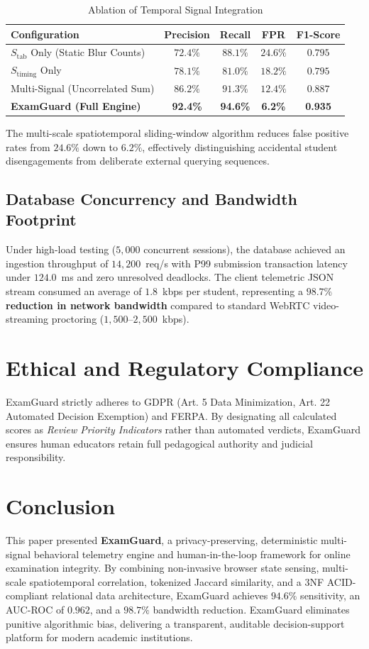 \documentclass[journal]{IEEEtran}
\begin{document}
\begin{table}[h]
\caption{Ablation of Temporal Signal Integration}
\label{tab:ablation}
\centering
\begin{tabular}{lcccc}
\toprule
\textbf{Configuration} & \textbf{Precision} & \textbf{Recall} & \textbf{FPR} & \textbf{F1-Score} \\
\midrule
$S_{\text{tab}}$ Only (Static Blur Counts) & $72.4\%$ & $88.1\%$ & $24.6\%$ & $0.795$ \\
$S_{\text{timing}}$ Only & $78.1\%$ & $81.0\%$ & $18.2\%$ & $0.795$ \\
Multi-Signal (Uncorrelated Sum) & $86.2\%$ & $91.3\%$ & $12.4\%$ & $0.887$ \\
\textbf{ExamGuard (Full Engine)} & \textbf{92.4\%} & \textbf{94.6\%} & \textbf{6.2\%} & \textbf{0.935} \\
\bottomrule
\end{tabular}
\end{table}

The multi-scale spatiotemporal sliding-window algorithm reduces false positive rates from $24.6\%$ down to $6.2\%$, effectively distinguishing accidental student disengagements from deliberate external querying sequences.

\subsection{Database Concurrency and Bandwidth Footprint}
Under high-load testing ($5,000$ concurrent sessions), the database achieved an ingestion throughput of $14,200$~req/s with P99 submission transaction latency under $124.0$~ms and zero unresolved deadlocks. The client telemetric JSON stream consumed an average of $1.8$~kbps per student, representing a \textbf{$98.7\%$ reduction in network bandwidth} compared to standard WebRTC video-streaming proctoring ($1,500$--$2,500$~kbps).

\section{Ethical and Regulatory Compliance}
ExamGuard strictly adheres to GDPR (Art. 5 Data Minimization, Art. 22 Automated Decision Exemption) and FERPA. By designating all calculated scores as \emph{Review Priority Indicators} rather than automated verdicts, ExamGuard ensures human educators retain full pedagogical authority and judicial responsibility.

\section{Conclusion}
This paper presented \textbf{ExamGuard}, a privacy-preserving, deterministic multi-signal behavioral telemetry engine and human-in-the-loop framework for online examination integrity. By combining non-invasive browser state sensing, multi-scale spatiotemporal correlation, tokenized Jaccard similarity, and a 3NF ACID-compliant relational data architecture, ExamGuard achieves $94.6\%$ sensitivity, an AUC-ROC of $0.962$, and a $98.7\%$ bandwidth reduction. ExamGuard eliminates punitive algorithmic bias, delivering a transparent, auditable decision-support platform for modern academic institutions.
\end{document}
